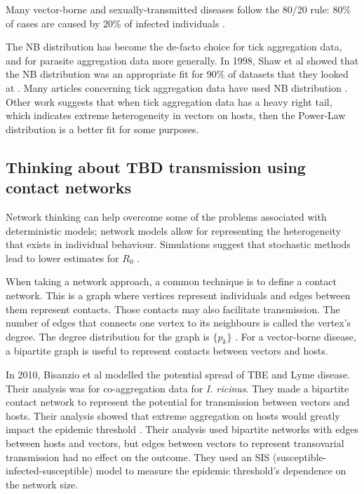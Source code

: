\documentclass{article}
\begin{document}
Many vector-borne and sexually-transmitted diseases follow the 80/20 rule: 80\% of cases are caused by 20\% of infected individuals \cite{Woolhouse1997}.


The NB distribution has become the de-facto choice for tick aggregation data, and for parasite aggregation data more generally. In 1998, Shaw et al showed that the NB distribution was an appropriate fit for 90\% of datasets that they looked at \cite{SHAW1998}. Many articles concerning tick aggregation data have used NB distribution \cite{Bown2003, HARRISON2012, Brunner2008}. Other work suggests that when tick aggregation data has a heavy right tail, which indicates extreme heterogeneity in vectors on hosts, then the Power-Law distribution is a better fit \cite{Ferreri2014, Bisanzio2010} for some purposes.

\subsection{Thinking about TBD transmission using contact networks}

Network thinking can help overcome some of the problems associated with deterministic models; network models allow for representing the heterogeneity that exists in individual behaviour. Simulations suggest that stochastic methods lead to lower estimates for $ R_0 $ \cite{Brauer2008b}.

When taking a network approach, a common technique  is to define a contact network. This is a graph where vertices represent individuals and edges between them represent contacts. Those contacts may also facilitate transmission. The number of edges that connects one vertex to its neighbours is called the vertex's degree. The degree distribution for the graph is  $ \{ p_k \} $  \cite{Brauer2008b}. For a vector-borne disease, a bipartite graph is useful to represent contacts between vectors and hosts.

In 2010, Bisanzio et al modelled the potential spread of TBE and Lyme disease. Their analysis was for co-aggregation data for \textit{I. ricinus}. They made a bipartite contact network to represent the potential for transmission between vectors and hosts. Their analysis showed that extreme aggregation on hosts would greatly impact the epidemic threshold \cite{Bisanzio2010}. Their analysis used bipartite networks with edges between hosts and vectors, but edges between vectors to represent transovarial transmission had no effect on the outcome. They used an SIS (susceptible-infected-susceptible) model to measure the epidemic threshold's dependence on the network size.
\end{document}
